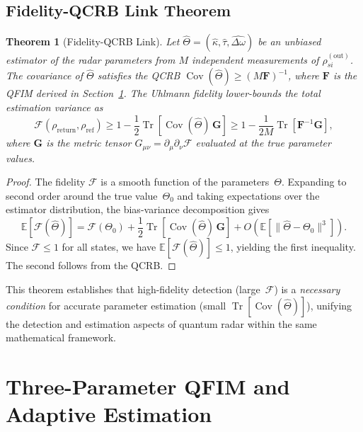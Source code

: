 \documentclass[journal]{IEEEtran}
\newtheorem{theorem}{Theorem}
\DeclareMathOperator{\Tr}{Tr}
\DeclareMathOperator{\Cov}{Cov}
\begin{document}
\subsection{Fidelity-QCRB Link Theorem}

\begin{theorem}[Fidelity-QCRB Link]\label{thm:fidelity_qcrb}
Let $\hat{\Theta} = (\hat{\kappa}, \hat{\tau}, \hat{\Delta\omega})$ be an unbiased estimator of the radar parameters from $M$ independent measurements of $\rho_{si}^{(\text{out})}$. The covariance of $\hat{\Theta}$ satisfies the QCRB $\Cov(\hat{\Theta}) \geq (M\mathbf{F})^{-1}$, where $\mathbf{F}$ is the QFIM derived in Section~\ref{sec:qfim}. The Uhlmann fidelity lower-bounds the total estimation variance as
\begin{equation}\label{eq:fidelity_qcrb}
\mathcal{F}(\rho_{\text{return}}, \rho_{\text{ref}}) \geq 1 - \frac{1}{2}\Tr[\Cov(\hat{\Theta})\,\mathbf{G}] \geq 1 - \frac{1}{2M}\Tr[\mathbf{F}^{-1}\mathbf{G}],
\end{equation}
where $\mathbf{G}$ is the metric tensor $G_{\mu\nu} = \partial_\mu\partial_\nu \mathcal{F}$ evaluated at the true parameter values.
\end{theorem}

\begin{proof}
The fidelity $\mathcal{F}$ is a smooth function of the parameters~$\Theta$. Expanding to second order around the true value~$\Theta_0$ and taking expectations over the estimator distribution, the bias-variance decomposition gives
\begin{equation}
\mathbb{E}[\mathcal{F}(\hat{\Theta})] = \mathcal{F}(\Theta_0) + \frac{1}{2}\Tr[\Cov(\hat{\Theta})\,\mathbf{G}] + O(\mathbb{E}[\|\hat{\Theta} - \Theta_0\|^3]).
\end{equation}
Since $\mathcal{F} \leq 1$ for all states, we have $\mathbb{E}[\mathcal{F}(\hat{\Theta})] \leq 1$, yielding the first inequality. The second follows from the QCRB.
\end{proof}

This theorem establishes that high-fidelity detection (large~$\mathcal{F}$) is a \textit{necessary condition} for accurate parameter estimation (small $\Tr[\Cov(\hat{\Theta})]$), unifying the detection and estimation aspects of quantum radar within the same mathematical framework.


\section{Three-Parameter QFIM and Adaptive Estimation}\label{sec:qfim}
\end{document}
